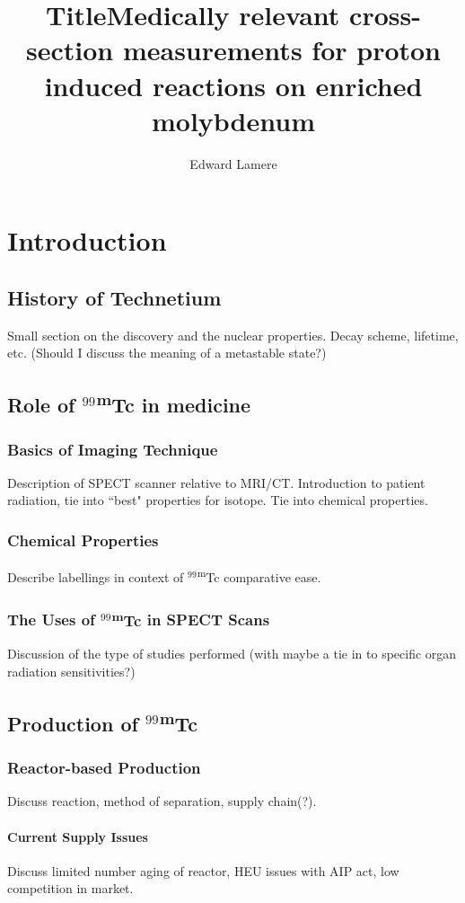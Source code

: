 \documentclass[final,3p,times,twocolumn,authoryear]{elsarticle_modified}
\newcommand{\tc}{ {\normalfont $^{99}$\textsuperscript{m}Tc} }
\begin{document}
\begin{frontmatter}

\title{Title}
\author{Edward Lamere}
\title{Medically relevant cross-section  measurements for proton induced reactions on enriched molybdenum}
\end{frontmatter}

\section{Introduction}\label{intro}
	\subsection{History of Technetium} %
	Small section on the discovery and the nuclear properties. Decay scheme, lifetime, etc. (Should I discuss the meaning of a metastable state?)
	\subsection{Role of \tc in medicine} 
		\subsubsection{Basics of Imaging Technique}
		Description of SPECT scanner relative to MRI/CT. Introduction to patient radiation, tie into ``best" properties for isotope.
		Tie into chemical properties. 
		\subsubsection{Chemical Properties} Describe labellings in context of \tc comparative ease.
		\subsubsection{The Uses of \tc in SPECT Scans}Discussion of the type of studies performed (with maybe a tie in to specific organ radiation sensitivities?)
	\subsection{Production of \tc}
		\subsubsection{Reactor-based Production}
		Discuss reaction, method of separation, supply chain(?).
			\paragraph{Current Supply Issues}
			Discuss limited number aging of reactor, HEU issues with AIP act, low competition in market.
\end{document}
